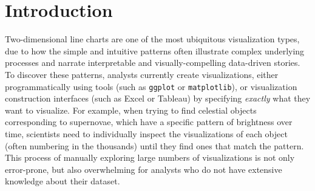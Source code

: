 \section{Introduction\label{sec:intro}}
Two-dimensional line charts are one of the most ubiquitous visualization types, due to how the simple and intuitive patterns often illustrate complex underlying processes and narrate interpretable and visually-compelling data-driven stories.%
To discover these patterns, analysts currently create visualizations, either programmatically using tools (such as {\tt ggplot} or {\tt matplotlib}), or visualization construction interfaces (such as Excel or Tableau) by specifying \textit{exactly} what they want to visualize. For example, when trying to find celestial objects corresponding to supernovae, which have a specific pattern
of brightness over time, scientists need to individually inspect the visualizations of each object (often numbering in the thousands) until they find ones that match the pattern.  This process of manually exploring large numbers of visualizations is not only error-prone, but also overwhelming for analysts who do not have extensive knowledge about their dataset.

